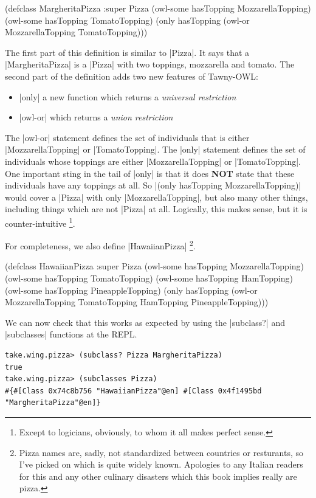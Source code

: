 \begin{tawny}
(defclass MargheritaPizza
  :super
  Pizza
  (owl-some hasTopping MozzarellaTopping)
  (owl-some hasTopping TomatoTopping)
  (only hasTopping (owl-or MozzarellaTopping TomatoTopping)))
\end{tawny}

The first part of this definition is similar to |Pizza|. It says that a
|MargheritaPizza| is a |Pizza| with two toppings, mozzarella and tomato. The
second part of the definition adds two new features of Tawny-OWL:

\begin{itemize}
\item |only| a new function which returns a \emph{universal restriction}
\item |owl-or| which returns a \emph{union restriction}
\end{itemize}

The |owl-or| statement defines the set of individuals that is either
|MozzarellaTopping| or |TomatoTopping|. The |only| statement
defines the set of individuals whose toppings are either
|MozzarellaTopping| or |TomatoTopping|. One important sting in the
tail of |only| is that it does \textbf{NOT} state that these individuals
have any toppings at all. So |(only hasTopping MozzarellaTopping)| would
cover a |Pizza| with only |MozzarellaTopping|, but also many other
things, including things which are not |Pizza| at all. Logically, this
makes sense, but it is counter-intuitive \footnote{Except to logicians,
  obviously, to whom it all makes perfect sense.}.

For completeness, we also define |HawaiianPizza| \footnote{Pizza names are, sadly,
not standardized between countries or resturants, so I've picked on which is
quite widely known. Apologies to any Italian readers for this and any other
culinary disasters which this book implies really are pizza.}.

\begin{tawny}
(defclass HawaiianPizza
  :super
  Pizza
  (owl-some hasTopping MozzarellaTopping)
  (owl-some hasTopping TomatoTopping)
  (owl-some hasTopping HamTopping)
  (owl-some hasTopping PineappleTopping)
  (only hasTopping
        (owl-or MozzarellaTopping TomatoTopping HamTopping PineappleTopping)))
\end{tawny}

We can now check that this works as expected by using the |subclass?| and
|subclasses| functions at the REPL.

\begin{verbatim}
take.wing.pizza> (subclass? Pizza MargheritaPizza)
true
take.wing.pizza> (subclasses Pizza)
#{#[Class 0x74c8b756 "HawaiianPizza"@en] #[Class 0x4f1495bd "MargheritaPizza"@en]}
\end{verbatim}

